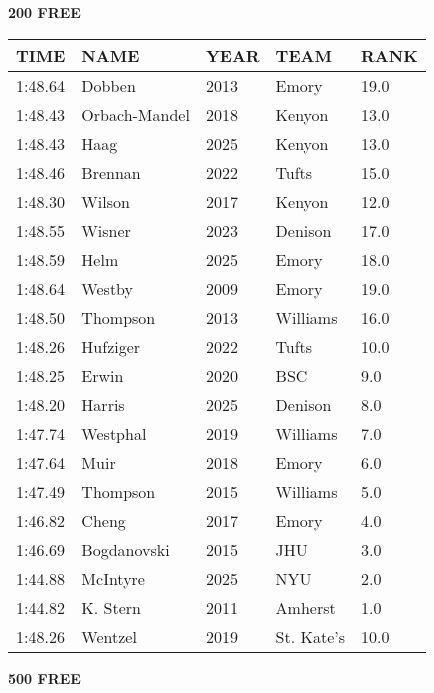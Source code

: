 \begin{table}[H]
\centering
\begin{minipage}[t]{0.48\textwidth}
\centering
\textbf{200 FREE}\\[0.1cm]
\begin{tabular}{@{}p{1.8cm}p{2.8cm}p{1.2cm}p{1.4cm}p{0.8cm}@{}}
\hline
    \textbf{TIME} & \textbf{NAME} & \textbf{YEAR} & \textbf{TEAM} & \textbf{RANK} \\
\hline
    1:48.64 & Dobben & 2013 & Emory & 19.0 \\
    1:48.43 & Orbach-Mandel & 2018 & Kenyon & 13.0 \\
    1:48.43 & Haag & 2025 & Kenyon & 13.0 \\
    1:48.46 & Brennan & 2022 & Tufts & 15.0 \\
    1:48.30 & Wilson & 2017 & Kenyon & 12.0 \\
    1:48.55 & Wisner & 2023 & Denison & 17.0 \\
    1:48.59 & Helm & 2025 & Emory & 18.0 \\
    1:48.64 & Westby & 2009 & Emory & 19.0 \\
    1:48.50 & Thompson & 2013 & Williams & 16.0 \\
    1:48.26 & Hufziger & 2022 & Tufts & 10.0 \\
    1:48.25 & Erwin & 2020 & BSC & 9.0 \\
    1:48.20 & Harris & 2025 & Denison & 8.0 \\
    1:47.74 & Westphal & 2019 & Williams & 7.0 \\
    1:47.64 & Muir & 2018 & Emory & 6.0 \\
    1:47.49 & Thompson & 2015 & Williams & 5.0 \\
    1:46.82 & Cheng & 2017 & Emory & 4.0 \\
    1:46.69 & Bogdanovski & 2015 & JHU & 3.0 \\
    1:44.88 & McIntyre & 2025 & NYU & 2.0 \\
    1:44.82 & K. Stern & 2011 & Amherst & 1.0 \\
    1:48.26 & Wentzel & 2019 & St. Kate's & 10.0 \\
\hline
\end{tabular}
\end{minipage}\hfill
\begin{minipage}[t]{0.48\textwidth}
\centering
\textbf{500 FREE}\\[0.1cm]
\begin{tabular}{@{}p{1.8cm}p{2.8cm}p{1.2cm}p{1.4cm}p{0.8cm}@{}}

\end{tabular}
\end{minipage}
\end{table}
